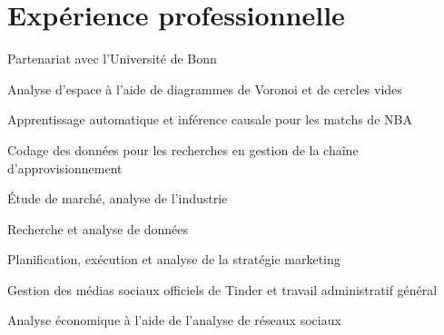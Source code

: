 
\section{Expérience professionnelle}

\begin{tightemize}
    \item Partenariat avec l'Université de Bonn
\end{tightemize}
\sectionsep

\begin{tightemize}
    \item Analyse d'espace à l'aide de diagrammes de Voronoi et de cercles vides
\end{tightemize}
\sectionsep

  
\begin{tightemize}
\item Apprentissage automatique et inférence causale pour les matchs de NBA
\item Codage des données pour les recherches en gestion de la chaîne d'approvisionnement
    \end{tightemize}
\sectionsep

\begin{tightemize}
\item Étude de marché, analyse de l'industrie
\item Recherche et analyse de données
\item Planification, exécution et analyse de la stratégie marketing
\item Gestion des médias sociaux officiels de Tinder et travail administratif général
\end{tightemize}
\sectionsep

\begin{tightemize}
\item Analyse économique à l'aide de l'analyse de réseaux sociaux
\end{tightemize}
\sectionsep

